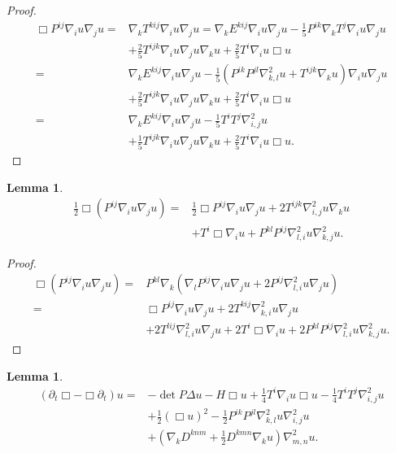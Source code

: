 \documentclass{amsart}
\newtheorem{lemma}[theorem]{Lemma}
\theoremstyle{definition}
\theoremstyle{remark}
\numberwithin{equation}{section}
\begin{document}
\begin{proof}
\begin{align*}
\Box P^{ij}\nabla_iu\nabla_ju=&\nabla_kT^{kij}\nabla_iu\nabla_ju=\nabla_k E^{kij}\nabla_iu\nabla_ju-\frac{1}{5}P^{ik}\nabla_kT^j\nabla_iu\nabla_ju\\
&+\frac{2}{5}T^{ijk}\nabla_iu\nabla_ju\nabla_ku+\frac{2}{5}T^{i}\nabla_iu\Box u\\
=&\nabla_k E^{kij}\nabla_iu\nabla_ju-\frac{1}{5}\left(P^{ik}P^{jl}\nabla^2_{k,l}u+T^{ijk}\nabla_ku\right)\nabla_iu\nabla_ju\\
&+\frac{2}{5}T^{ijk}\nabla_iu\nabla_ju\nabla_ku+\frac{2}{5}T^{i}\nabla_iu\Box u\\
=&\nabla_k E^{kij}\nabla_iu\nabla_ju-\frac{1}{5}T^iT^j\nabla^2_{i,j}u\\
&+\frac{1}{5}T^{ijk}\nabla_iu\nabla_ju\nabla_ku+\frac{2}{5}T^{i}\nabla_iu\Box u.
\end{align*}
\end{proof}
\begin{lemma}
\begin{align*}
\frac{1}{2}\Box\left(P^{ij}\nabla_i u\nabla_ju\right)=&\frac{1}{2}\Box P^{ij}\nabla_i u\nabla_ju+2T^{ijk}\nabla^2_{i,j}u\nabla_ku\\
&+T^i\Box\nabla_i u+P^{kl}P^{ij}\nabla^2_{l,i}u\nabla^2_{k,j}u.
\end{align*}
\end{lemma}
\begin{proof}
\begin{align*}
\Box\left(P^{ij}\nabla_i u\nabla_ju\right)=&P^{kl}\nabla_k\left(\nabla_lP^{ij}\nabla_iu\nabla_ju+2P^{ij}\nabla^2_{l,i}u\nabla_ju\right)\\
=&\Box P^{ij}\nabla_i u\nabla_ju+2T^{kij}\nabla^2_{k,i}u\nabla_ju\\
&+2T^{lij}\nabla^2_{l,i}u\nabla_ju+2T^i\Box\nabla_i u+2P^{kl}P^{ij}\nabla^2_{l,i}u\nabla^2_{k,j}u.
\end{align*}
\end{proof}
\begin{lemma}
\begin{align*}
(\partial_t \Box-\Box\partial_t) u=
&-\det P\Delta u-H\Box u+\frac{1}{4}T^i\nabla_iu\Box u-\frac{1}{4}T^iT^j\nabla^2_{i,j}u\\
&+\frac{1}{2}(\Box u)^2-\frac{1}{2}P^{ik}P^{jl}\nabla^2_{k,l}u\nabla^2_{i,j}u\\
&+\left(\nabla_kD^{knm}+\frac{1}{2}D^{kmn}\nabla_ku\right)\nabla^2_{m,n}u.
\end{align*}
\end{lemma}
\end{document}

